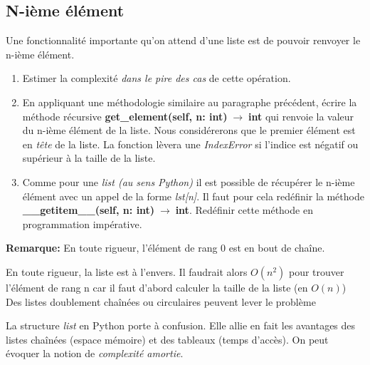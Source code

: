 \documentclass[a4paper,11pt]{article}
\begin{document}
\begin{Form}
\subsection{N-ième élément}
Une fonctionnalité importante qu'on attend d'une liste est de pouvoir renvoyer le n-ième élément.
\begin{activite}
\begin{enumerate}
\item Estimer la complexité \textit{dans le pire des cas} de cette opération.
\item En appliquant une méthodologie similaire au paragraphe précédent, écrire la méthode récursive \textbf{get\_element(self, n: int)$\;\rightarrow\;$int} qui renvoie la valeur du n-ième élément de la liste. Nous considérerons que le premier élément est en \textit{tête} de la liste. La fonction lèvera une \textit{IndexError} si l'indice est négatif ou supérieur à la taille de la liste.
\item Comme pour une \textit{list (au sens Python)} il est possible de récupérer le n-ième élément avec un appel de la forme \textit{lst[n]}. Il faut pour cela redéfinir la méthode \textbf{\_\_getitem\_\_(self, n: int)$\;\rightarrow\;$int}. Redéfinir cette méthode en programmation impérative.
\end{enumerate}
\end{activite}
\textbf{Remarque:} En toute rigueur, l'élément de rang 0 est en bout de chaîne.
\begin{commentprof}
En toute rigueur, la liste est à l'envers. Il faudrait alors $O(n^2)$ pour trouver l'élément de rang n car il faut d'abord calculer la taille de la liste (en $O(n)$)\\
Des listes doublement chaînées ou circulaires peuvent lever le problème
\end{commentprof} 
\begin{commentprof}
La structure \textit{list} en Python porte à confusion. Elle allie en fait les avantages des listes chaînées (espace mémoire) et des tableaux (temps d'accès). On peut évoquer la notion de \textit{complexité amortie}.
\end{commentprof}
\end{Form}
\end{document}
